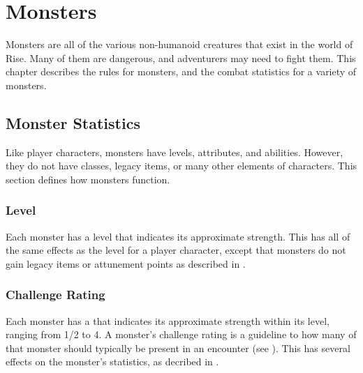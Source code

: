 \chapter{Monsters}

Monsters are all of the various non-humanoid creatures that exist in the world of Rise.
Many of them are dangerous, and adventurers may need to fight them.
This chapter describes the rules for monsters, and the combat statistics for a variety of monsters.

\section{Monster Statistics}
    Like player characters, monsters have levels, attributes, and abilities.
    However, they do not have classes, legacy items, or many other elements of characters.
    This section defines how monsters function.

    \subsection{Level}
        Each monster has a level that indicates its approximate strength.
        This has all of the same effects as the level for a player character, except that monsters do not gain legacy items or attunement points as described in .

    \subsection{Challenge Rating}\label{Challenge Rating}
        Each monster has a  that indicates its approximate strength within its level, ranging from 1/2 to 4.
        A monster's challenge rating is a guideline to how many of that monster should typically be present in an encounter (see ).
        This has several effects on the monster's statistics, as decribed in .

